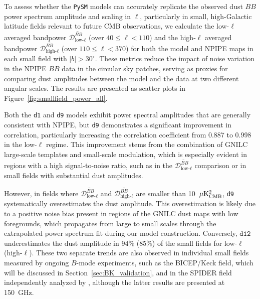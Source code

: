 \documentclass[twocolumn]{aastex631}
\begin{document}
To assess whether the \texttt{PySM} models can accurately replicate the observed dust $BB$ power spectrum amplitude and scaling in $\ell$, particularly in small, high-Galactic latitude fields relevant to future CMB observations, we calculate the low-$\ell$ averaged bandpower $\overline{\mathcal{D}_{\text{low-}\ell}^{BB}}$ (over $40 \le \ell < 110$) and the high-$\ell$ averaged bandpower $\overline{\mathcal{D}_{\text{high-}\ell}^{BB}}$ (over $110 \le \ell < 370$) for both the model and NPIPE maps in each small field with $|b| > 30^\circ$. These metrics reduce the impact of noise variation in the NPIPE $BB$ data in the circular sky patches, serving as proxies for comparing dust amplitudes between the model and the data at two different angular scales. The results are presented as scatter plots in Figure~\ref{fig:smallfield_power_all}.

Both the \texttt{d1} and \texttt{d9} models exhibit power spectral amplitudes that are generally consistent with NPIPE, but \texttt{d9} demonstrates a significant improvement in correlation, particularly increasing the correlation coefficient from 0.887 to 0.998 in the low-$\ell$ regime. This improvement stems from the combination of GNILC large-scale templates and small-scale modulation, which is especially evident in regions with a high signal-to-noise ratio, such as in the $\overline{\mathcal{D}_{\text{low-}\ell}^{BB}}$ comparison or in small fields with substantial dust amplitudes. 

However, in fields where $\overline{\mathcal{D}_{\text{low-}\ell}^{BB}}$ and $\overline{\mathcal{D}_{\text{high-}\ell}^{BB}}$ are smaller than 10~$\mu\rm{K^2_{CMB}}$, \texttt{d9} systematically overestimates the dust amplitude. This overestimation is likely due to a positive noise bias present in regions of the GNILC dust maps with low foregrounds, which propagates from large to small scales through the extrapolated power spectrum fit during our model construction. Conversely, $\texttt{d12}$ underestimates the dust amplitude in 94\% (85\%) of the small fields for low-$\ell$ (high-$\ell$). These two separate trends are also observed in individual small fields measured by ongoing $B$-mode experiments, such as the BICEP/Keck field, which will be discussed in Section~\ref{sec:BK_validation}, and in the SPIDER field independently analyzed by \cite{Ade:2025}, although the latter results are presented at 150~GHz. 
\end{document}
